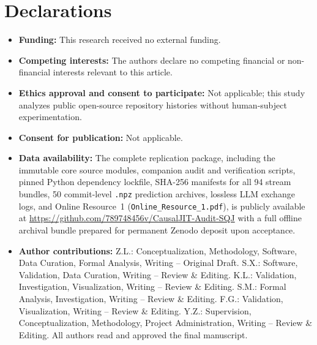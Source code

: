 \documentclass[pdflatex,sn-basic]{sn-jnl}
\theoremstyle{definition}
\theoremstyle{plain}
\begin{document}
\section*{Declarations}
\begin{itemize}[leftmargin=1.5em,itemsep=0.10em]
  \item \textbf{Funding:} This research received no external funding.
  \item \textbf{Competing interests:} The authors declare no competing financial or non-financial interests relevant to this article.
  \item \textbf{Ethics approval and consent to participate:} Not applicable; this study analyzes public open-source repository histories without human-subject experimentation.
  \item \textbf{Consent for publication:} Not applicable.
  \item \textbf{Data availability:} The complete replication package, including the immutable core source modules, companion audit and verification scripts, pinned Python dependency lockfile, SHA-256 manifests for all 94 stream bundles, 50 commit-level \texttt{.npz} prediction archives, lossless LLM exchange logs, and Online Resource~1 (\texttt{Online\_Resource\_1.pdf}), is publicly available at \url{https://github.com/789748456v/CausalJIT-Audit-SQJ} with a full offline archival bundle prepared for permanent Zenodo deposit upon acceptance.
  \item \textbf{Author contributions:} Z.L.: Conceptualization, Methodology, Software, Data Curation, Formal Analysis, Writing -- Original Draft. S.X.: Software, Validation, Data Curation, Writing -- Review \& Editing. K.L.: Validation, Investigation, Visualization, Writing -- Review \& Editing. S.M.: Formal Analysis, Investigation, Writing -- Review \& Editing. F.G.: Validation, Visualization, Writing -- Review \& Editing. Y.Z.: Supervision, Conceptualization, Methodology, Project Administration, Writing -- Review \& Editing. All authors read and approved the final manuscript.
\end{itemize}
\end{document}
